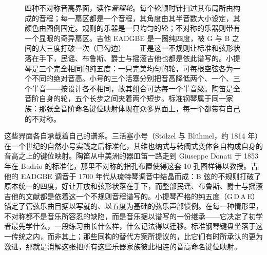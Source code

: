 \documentclass[10pt,letterpaper,twocolumn]{article}
\begin{document}
\begin{figure}[t]
{}
\endgroup
\caption{四种不对称音高界面，读作\emph{音程轮}。每个轮顺时针扫过其布局所由构成的音程；每一扇区都是一个音程，其角度由其半音数大小设定，其颜色由图例固定。规则的乐器是一只均匀的轮；不对称的乐器则带有一个显眼的奇异扇区。吉他 EADGBE 是一圈纯四度，被 G 与 B 之间的大三度打破一次（已勾边）——正是这一不规则让标准和弦形状落在手下，民谣、布鲁斯、爵士与摇滚吉他也都是依此谱写的。小提琴是三个完全相同的纯五度：一只完美均匀的轮，可每根空弦各为一个不同的绝对音高。小号的三个活塞分别把音高降低两个、一个、三个半音——按设计各不相同，故其组合可达每一个半音级。陶笛是全音阶自身的轮，五个长步之间夹着两个短步。标准钢琴属于同一家族：那张全音阶命名键位映射体现在众多界面上，每一个都带有自己的不对称。}
\label{fig:asymmetric-instruments}
\end{figure}

这些界面各自承载着自己的谱系。三活塞小号（Stölzel 与 Blühmel，约 1814 年）在一个世纪的自然小号实践之后标准化，其维也纳式与转阀式变体各自构成自身的音高之上的键位映射。陶笛从中美洲的器皿笛一路走到 Giuseppe Donati 于 1853 年在 Budrio 的标准化，那里不对称的指孔布置使得这套 10 孔图样得以教授。吉他的 EADGBE 调音于 1700 年代从琉特琴调音中结晶而成：B 弦的不规则打破了原本统一的四度，好让开放和弦形状落在手下，而整部民谣、布鲁斯、爵士与摇滚吉他的文献都是依着这一个不规则音程谱写的。小提琴严格的纯五度（G\,D\,A\,E）锚定了管弦乐曲目据以写就的、以五度为基础的弦乐声部惯例。在每一种情形里，不对称都不是音乐所容忍的缺陷，而是音乐据以谱写的一份继承——它决定了初学者最先学什么，一段练习曲长什么样，什么记法得以迁移。标准钢琴键盘坐落于这一传统之内，而非其上；那些同构的替代方案所提议的，比它们有时所承认的更为激进，那就是消解这张把所有这些乐器家族彼此相连的音高命名键位映射。
\end{document}
